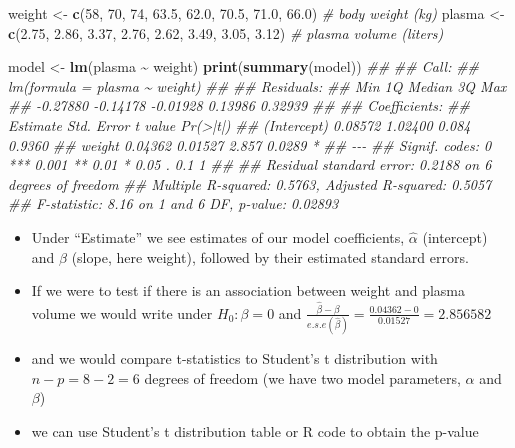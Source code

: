 \documentclass[
]{book}
\newenvironment{Shaded}{\begin{snugshade}}{\end{snugshade}}
\newcommand{\CommentTok}[1]{\textcolor[rgb]{0.56,0.35,0.01}{\textit{#1}}}
\newcommand{\DecValTok}[1]{\textcolor[rgb]{0.00,0.00,0.81}{#1}}
\newcommand{\FloatTok}[1]{\textcolor[rgb]{0.00,0.00,0.81}{#1}}
\newcommand{\KeywordTok}[1]{\textcolor[rgb]{0.13,0.29,0.53}{\textbf{#1}}}
\newcommand{\NormalTok}[1]{#1}
\newcommand{\OperatorTok}[1]{\textcolor[rgb]{0.81,0.36,0.00}{\textbf{#1}}}
\newcommand{\StringTok}[1]{\textcolor[rgb]{0.31,0.60,0.02}{#1}}
\providecommand{\tightlist}{%
  \setlength{\itemsep}{0pt}\setlength{\parskip}{0pt}}
\theoremstyle{definition}
\theoremstyle{definition}
\theoremstyle{definition}
\theoremstyle{remark}
\begin{document}
\begin{Shaded}
\begin{Highlighting}[]
\NormalTok{weight \textless{}{-}}\StringTok{ }\KeywordTok{c}\NormalTok{(}\DecValTok{58}\NormalTok{, }\DecValTok{70}\NormalTok{, }\DecValTok{74}\NormalTok{, }\FloatTok{63.5}\NormalTok{, }\FloatTok{62.0}\NormalTok{, }\FloatTok{70.5}\NormalTok{, }\FloatTok{71.0}\NormalTok{, }\FloatTok{66.0}\NormalTok{) }\CommentTok{\# body weight (kg)}
\NormalTok{plasma \textless{}{-}}\StringTok{ }\KeywordTok{c}\NormalTok{(}\FloatTok{2.75}\NormalTok{, }\FloatTok{2.86}\NormalTok{, }\FloatTok{3.37}\NormalTok{, }\FloatTok{2.76}\NormalTok{, }\FloatTok{2.62}\NormalTok{, }\FloatTok{3.49}\NormalTok{, }\FloatTok{3.05}\NormalTok{, }\FloatTok{3.12}\NormalTok{) }\CommentTok{\# plasma volume (liters)}

\NormalTok{model \textless{}{-}}\StringTok{ }\KeywordTok{lm}\NormalTok{(plasma }\OperatorTok{\textasciitilde{}}\StringTok{ }\NormalTok{weight)}
\KeywordTok{print}\NormalTok{(}\KeywordTok{summary}\NormalTok{(model))}
\CommentTok{\#\# }
\CommentTok{\#\# Call:}
\CommentTok{\#\# lm(formula = plasma \textasciitilde{} weight)}
\CommentTok{\#\# }
\CommentTok{\#\# Residuals:}
\CommentTok{\#\#      Min       1Q   Median       3Q      Max }
\CommentTok{\#\# {-}0.27880 {-}0.14178 {-}0.01928  0.13986  0.32939 }
\CommentTok{\#\# }
\CommentTok{\#\# Coefficients:}
\CommentTok{\#\#             Estimate Std. Error t value Pr(\textgreater{}|t|)  }
\CommentTok{\#\# (Intercept)  0.08572    1.02400   0.084   0.9360  }
\CommentTok{\#\# weight       0.04362    0.01527   2.857   0.0289 *}
\CommentTok{\#\# {-}{-}{-}}
\CommentTok{\#\# Signif. codes:  0 \textquotesingle{}***\textquotesingle{} 0.001 \textquotesingle{}**\textquotesingle{} 0.01 \textquotesingle{}*\textquotesingle{} 0.05 \textquotesingle{}.\textquotesingle{} 0.1 \textquotesingle{} \textquotesingle{} 1}
\CommentTok{\#\# }
\CommentTok{\#\# Residual standard error: 0.2188 on 6 degrees of freedom}
\CommentTok{\#\# Multiple R{-}squared:  0.5763,	Adjusted R{-}squared:  0.5057 }
\CommentTok{\#\# F{-}statistic:  8.16 on 1 and 6 DF,  p{-}value: 0.02893}
\end{Highlighting}
\end{Shaded}

\begin{itemize}
\tightlist
\item
  Under ``Estimate'' we see estimates of our model coefficients, \(\hat{\alpha}\) (intercept) and \(\hat{\beta}\) (slope, here weight), followed by their estimated standard errors.
\item
  If we were to test if there is an association between weight and plasma volume we would write under \(H_0: \beta = 0\) and \(\frac{\hat{\beta}-\beta}{e.s.e(\hat{\beta})} = \frac{0.04362-0}{0.01527} = 2.856582\)
\item
  and we would compare t-statistics to Student's t distribution with \(n-p = 8 - 2 = 6\) degrees of freedom (we have two model parameters, \(\alpha\) and \(\beta\))
\item
  we can use Student's t distribution table or R code to obtain the p-value
\end{itemize}
\end{document}
